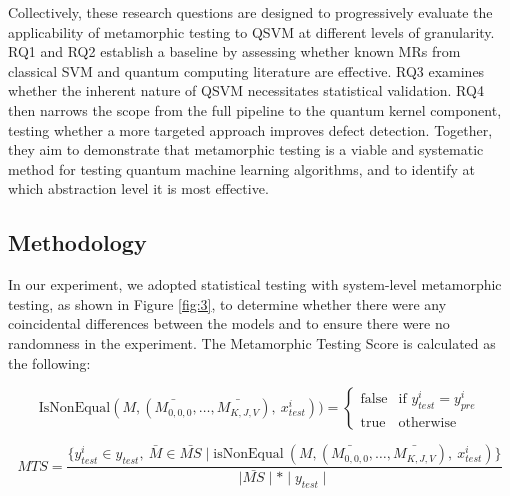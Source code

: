 \documentclass[12pt,a4paper]{article}
\begin{document}
	Collectively, these research questions are designed to progressively evaluate the
	applicability of metamorphic testing to QSVM at different levels of granularity.
	RQ1 and RQ2 establish a baseline by assessing whether known MRs from classical
	SVM and quantum computing literature are effective. RQ3 examines whether the
	inherent nature of QSVM necessitates statistical validation. RQ4 then narrows the
	scope from the full pipeline to the quantum kernel component, testing whether a
	more targeted approach improves defect detection. Together, they aim to demonstrate
	that metamorphic testing is a viable and systematic method for testing quantum
	machine learning algorithms, and to identify at which abstraction level it is most
	effective.
	
	\subsection{Methodology}
	
	In our experiment, we adopted statistical testing with system-level metamorphic testing, as shown in Figure \ref{fig:3}, to determine whether there were any coincidental differences between the models and to ensure there were no randomness \cite{10.1145/1985793.1985795} in the experiment. The Metamorphic Testing Score is calculated as the following:
	
	\[
	\text{IsNonEqual}(M, (\bar{M_{0,0,0}}, \ldots, \bar{M_{K,J,V}}),\ x_{test}^i)) =
	\begin{cases} 
		\text{false} & \text{if } y^i_{test} = y^i_{pre} 
		\\
		\text{true} & \text{otherwise}
	\end{cases}
	\]
	
	\begin{equation}
		\label{eq:MTS}
		MTS = \frac{\{y^i_{test} \in y_{test},\ {\bar{M}} \in \bar{MS} \mid \text{isNonEqual} \ (M, (\bar{M_{0,0,0}}, \ldots, \bar{M_{K,J,V}}),\ x_{test}^i)\}}{\mid \bar{MS} \mid * \mid y_{test} \mid} 
	\end{equation}
	
\end{document}
